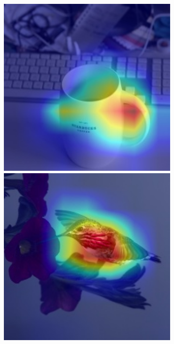 \begin{figure}[t]
\begin{subfigure}[b]{0.19\textwidth}
        \includegraphics[width=1\textwidth]{figures/qualitative_results/ILSVRC2012_val_00016576_resnet50.JPEG}
        \includegraphics[width=1\textwidth]{figures/qualitative_results/ILSVRC2012_val_00005779_resnet50.JPEG}

\end{subfigure}
\end{figure}
